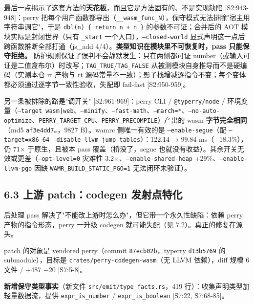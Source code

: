 \documentclass[11pt, a4paper]{article}
\begin{document}
最后一点揭示了这套方法的\textbf{天花板}，而且它是方法固有的、不是实现缺陷 [S2:943-948]：perry 把每个用户函数都导出（\texttt{\_\_wasm\_func\_N}），保守模式无法排除"宿主用字符串调它"，于是 \texttt{dbl(n) \{ return n + n \}} 的参数不可证；合并后的 AOT 模块实际是封闭世界（只有 \texttt{\_start} 一个入口），\texttt{--closed-world} 显式声明这一点后跨函数推断全部打通（js\_add 4/4）。\textbf{类型知识在模块里不可恢复时，pass 只能保守拒绝。} 防护规则保证了误判不会静默发生：只在两侧都可证 number（或输入可证是二值盒布尔）时改写；\texttt{TAG\_TRUE}/\texttt{TAG\_FALSE} 从被测模块自身推导而不是硬编码（实测本仓 rt 产物与 rt 源码常量不一致）；影子栈增减逐指令不变；每个变体都必须通过逐字节一致性验收，失配即 fail-fast [S2:950-959]。


另一条被排除的路是"调开关" [S2:961-969]：perry CLI / \texttt{@typerry/node} / 环境变量（\texttt{--target wasm|web}、\texttt{--minify}、\texttt{--fast-math}、\texttt{--march=*}、\texttt{--no-auto-optimize}、\texttt{PERRY\_TARGET\_CPU}、\texttt{PERRY\_PRECOMPILE}）产出的 wasm \textbf{字节完全相同}（md5 \texttt{af3e4dd7…}，9827 B）。wamrc 侧唯一有效的是 \texttt{--enable-segue}（配 \texttt{--target=x86\_64 --disable-llvm-jump-tables}）：122.14 → 99.84 ms（−18.3\%），仍 71× 于原生，且被本 pass 覆盖（桥没了，segue 也就没有收益）。其余开关无效或更差（\texttt{--opt-level=0} 灾难性 3.2×、\texttt{--enable-shared-heap} +29\%、\texttt{--enable-llvm-pgo} 因缺 \texttt{WAMR\_BUILD\_STATIC\_PGO=1} 无法闭环未验证）。


\subsection{6.3 上游 patch：codegen 发射点特化}

后处理 pass 解决了"不能改上游时怎么办"，但它带一个永久性缺陷：依赖 perry 产物的指令形态，perry 一升级 codegen 就可能失配（见 7.2）。真正的修复在源头。


patch 的对象是 vendored perry（commit \texttt{87ecb02b}，typerry \texttt{d13b5769} 的 submodule），目标是 \texttt{crates/perry-codegen-wasm}（无 LLVM 依赖），diff 规模 6 文件 / +487 −20 [S7:5-8]。


\textbf{新增保守类型事实}（新文件 \texttt{src/emit/type\_facts.rs}，419 行）：收集声明类型加轻量数据流，提供 \texttt{expr\_is\_number} / \texttt{expr\_is\_boolean} [S7:22, S7:68-85]。
\end{document}
